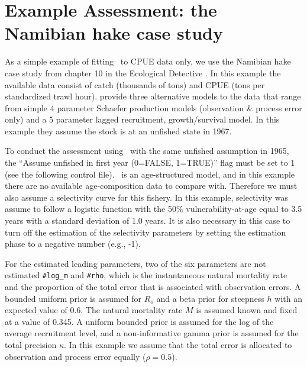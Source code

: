 

\section{Example Assessment: the Namibian hake case study}
\begin{multicols}{2}
As a simple example of fitting \iscam\ to CPUE data only, we use the Namibian hake case study from chapter 10 in the Ecological Detective \citep{hilborn1997ecological}.  In this example the available data consist of catch (thousands of tons) and CPUE (tons per standardized trawl hour).  \cite{hilborn1997ecological} provide three alternative models to the data that range from simple 4 parameter Schaefer production models (observation \& process error only) and a 5 parameter lagged recruitment, growth/survival model.  In this example they assume the stock is at an unfished state in 1967.

To conduct the assessment using \iscam\ with the same unfished assumption in 1965, the 			``Assume unfished in first year (0=FALSE, 1=TRUE)'' flag must be set to 1 (see the following control file). \iscam\ is an age-structured model, and in this example there are no available age-composition data to compare with. Therefore we must also assume a selectivity curve for this fishery.  In this example, selectivity was assume to follow a logistic function with the 50\% vulnerability-at-age equal to 3.5 years with a standard deviation of  1.0 years.  It is also necessary in this case to turn off the estimation of the selectivity parameters by setting the estimation phase to a negative number (e.g., -1).  

For the estimated leading parameters, two of the six parameters are not estimated \verb"#log_m" and \verb"#rho", which is the instantaneous natural mortality rate and the proportion of the total error that is associated with observation errors.  A bounded uniform prior is assumed for $R_o$ and a beta prior for steepness $h$ with an expected value of 0.6.  The natural mortality rate $M$ is assumed known and fixed at a value of 0.345.  A uniform bounded prior is assumed for the log of the average recruitment level, and a non-informative gamma prior is assumed for the total precision $\kappa$.  In this example we assume that the total error is allocated to observation and process error equally ($\rho= 0.5$).


\end{multicols}
